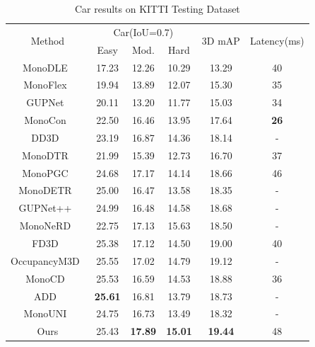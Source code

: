 \documentclass[journal]{IEEEtran}
\begin{document}
	\begin{table}[]
		\centering
		\caption{{Car results on KITTI Testing Dataset}}
		\label{tab:kitti_test}
		{%
			\begin{tabular}{cccccc}
				\toprule%
				\multirow{2}{*}{{Method}} & \multicolumn{3}{c}{{Car(IoU=0.7)}}                & \multirow{2}{*}{{3D mAP}} & \multirow{2}{*}{{Latency(ms)}} \\ \cmidrule{2-4}
				& {Easy}           & {Mod.}           & {Hard}           &                         \\ 
				\midrule%
				{MonoDLE~\cite{monodle}}			& {17.23}	& {12.26}	& {10.29}	& {13.29} & 40	\\
				{MonoFlex~\cite{monoflex}}			& {19.94}	& {13.89}   & {12.07}   & {15.30}	& 35 \\
				{GUPNet~\cite{gupnet}}            	& {20.11}   & {13.20}   & {11.77}   & {15.03}	& 34\\
				{MonoCon~\cite{monocon}}         	& {22.50}   & {16.46}   & {13.95}   & {17.64}	& \textbf{26} \\
				{DD3D~\cite{dd3d}}         			& {23.19}   & {16.87}   & {14.36}   & {18.14} & -	\\
				{MonoDTR~\cite{monodtr}}         	& {21.99}   & {15.39}   & {12.73}   & {16.70} & 37	\\
				{MonoPGC~\cite{monopgc}}         	& {24.68}   & {17.17}   & {14.14}   & {18.66}	& 46 \\
				{MonoDETR~\cite{monodetr}} & 25.00 & 16.47 & 13.58 & 18.35 & -
				\\
				{GUPNet++~\cite{gupnet++}}         	& {24.99}   & {16.48}   & {14.58}   & {18.68}	& -\\
				{MonoNeRD~\cite{mononerd}}         	& {22.75}   & {17.13}   & {15.63}   & {18.50} & -\\
				{FD3D~\cite{fd3d}}         	& {25.38}   & {17.12}   & {14.50}   & {19.00}	& 40 \\
				{OccupancyM3D~\cite{occupancym3d}}         	& {25.55}   & {17.02}   & {14.79}   & {19.12}	& -\\
				{MonoCD~\cite{monocd}}         	& {25.53}   & {16.59}   & {14.53}   & {18.88}	& 36\\
				{ADD~\cite{add}}         	& \textbf{25.61}   & {16.81}   & {13.79}   & {18.73}	& -\\
				{MonoUNI~\cite{monouni}}         	& {24.75}   & {16.73}   & {13.49}   & {18.32}	& -\\
				{Ours}         						& {25.43} 		& {\textbf{17.89}} 		& {\textbf{15.01}} 		& {\textbf{19.44}}   & 48	\\ 
				\bottomrule%
			\end{tabular}
		}
	\end{table}
	
\end{document}
